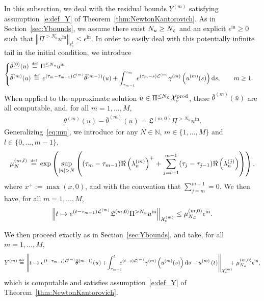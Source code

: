 \documentclass[10pt,a4paper]{article}
\theoremstyle{plain}
\newcommand{\NN}{\mathbb N}
\renewcommand{\L}{\mathcal{L}}
\newcommand{\X}{\mathcal{X}}
\newcommand{\bu}{\bar{u}}
\newcommand{\btheta}{\bar{\theta}}
\newcommand{\kL}{\mathfrak{L}}
\newcommand{\1}{\mathbf{1}}
\renewcommand{\d}{\mathrm{d}}
\newcommand{\uin}{{u^{\mathrm{in}}}}
\newcommand{\ds}{\displaystyle}
\newcommand{\pprod}{\mathrm{prod}}
\newcommand{\bydef}{\,\stackrel{\mbox{\tiny\textnormal{\raisebox{0ex}[0ex][0ex]{def}}}}{=}\,}
\newcommand{\Nu}{N_{u}}
\newcommand{\NL}{N_{\text{\tiny{$\L$}}}}
\newcommand{\Nin}{\Nu}
\begin{document}
In this subsection, we deal with the residual bounds $Y^{(m)}$ satisfying assumption~\eqref{e:def_Y} of Theorem~\ref{thm:NewtonKantorovich}. As in Section~\ref{sec:Ybounds}, we assume there exist $\Nin \geq \NL$ and an explicit $\epsilon^{\mathrm{in}}\geq 0$ such that $\left\Vert \Pi^{>\Nin}\uin \right\Vert_{\ell^1_\nu} \leq \epsilon^{\mathrm{in}}$.
In order to easily deal with this potentially infinite tail in the initial condition, we introduce
\begin{align*}
\begin{cases}
\ds \btheta^{(0)}(u) \bydef \Pi^{\leq\Nin}\uin,\\
\ds \btheta^{(m)}(u) \bydef e^{(\tau_{m}-\tau_{m-1})\L^{(m)}}\btheta^{(m-1)}(u) + \int_{\tau_{m-1}}^{\tau_m}e^{(\tau_{m}-s)\L^{(m)}} \gamma^{(m)} \left(u^{(m)}(s)\right) \d s,\qquad m\geq 1.
\end{cases}
\end{align*}
When applied to the approximate solution $\bu\in\Pi^{\leq \NL}\X_\nu^\pprod$, these $\btheta^{(m)}(\bu)$ are all computable, and, for all $m=1,\ldots,M$,
\begin{align*}
\theta^{(m)}(u) - \btheta^{(m)}(u) = \kL^{(m,0)}\Pi^{>\Nin}\uin.
\end{align*} 
Generalizing~\eqref{eq:mu}, we introduce for any $N\in\NN$, $m\in\{1,\ldots,M\}$ and $l\in\{0,\ldots,m-1\}$,
\begin{equation}
\label{eq:mumi}
\mu^{(m,l)}_N \bydef  \exp\left(\sup_{\vert n\vert >N} \left((\tau_m-\tau_{m-1}) \Re\left(\lambda_n^{(m)}\right)^+ + \sum_{j=l+1}^{m-1}(\tau_j-\tau_{j-1})\Re\left(\lambda_n^{(j)}\right)\right)\right),
\end{equation}
where $x^+ := \max(x,0)$, and with the convention that $\sum_{j=m}^{m-1}=0$. We then have, for all $m=1,\ldots,M$,
\begin{align*}
\left\Vert t\mapsto e^{(t-\tau_{m-1})\L^{(m)}}\kL^{(m,0)}\Pi^{>\Nin}\uin \right\Vert_{\X_\nu^{(m)}} \leq \mu_{\NL}^{(m,0)} \epsilon^{\mathrm{in}}.
\end{align*}

We then proceed exactly as in Section~\ref{sec:Ybounds}, and take, for all $m=1,\ldots,M$,
\begin{align*}
Y^{(m)} \!\bydef\! \left\Vert t\mapsto e^{(t-\tau_{m-1})\L^{(m)}} \btheta^{(m-1)}(\bu) +  \! \int_{\tau_{m-1}}^{t} \!\!\!\! e^{(t-s)\L^{(m)} } 
		\gamma^{(m)}\left(\bu^{(m)}(s)\right) \mbox{d} s - \bu^{(m)} \left( t \right) \right\Vert_{\X_\nu^{(m)}} \!\!\!\!+ \mu^{(m,0)}_{\Nin} \epsilon^{\mathrm{in}},
\end{align*}
which is computable and satisfies assumption~\eqref{e:def_Y} of Theorem~\ref{thm:NewtonKantorovich}.
\end{document}
